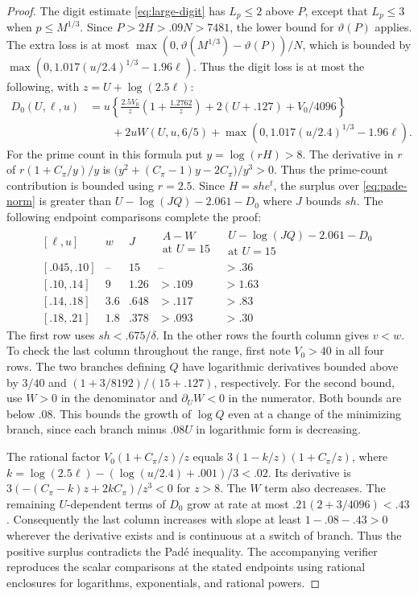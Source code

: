 \begin{proof}
The digit estimate \eqref{eq:large-digit} has \(L_p\le2\)
above \(P\), except that \(L_p\le3\) when \(p\le M^{1/3}\).
Since \(P>2H>.09N>7481\), the lower bound for
\(\vartheta(P)\) applies. The extra loss is at most
\(\max(0,\vartheta(M^{1/3})-\vartheta(P))/N\), which is
bounded by \(\max(0,1.017(u/2.4)^{1/3}-1.96\ell)\).
Thus the digit loss is at most the following, with
\(z=U+\log(2.5\ell)\):
\[
\begin{aligned}
 D_0(U,\ell,u)
  &=u\left\{\frac{2.5V_0}{z}\left(1+\frac{1.2762}{z}\right)
                       +2(U+.127)+V_0/4096\right\}\\
  &\qquad+2uW(U,u,6/5)+\max(0,1.017(u/2.4)^{1/3}-1.96\ell).
\end{aligned}
\]
For the prime count in this formula put \(y=\log(rH)>8\).
The derivative in \(r\) of \(r(1+C_\pi/y)/y\) is
\(\bigl(y^2+(C_\pi-1)y-2C_\pi\bigr)/y^3>0\).
Thus the prime-count contribution is bounded using \(r=2.5\). Since \(H=she^t\), the surplus over
\eqref{eq:pade-norm} is greater than
\(U-\log(JQ)-2.061-D_0\) where \(J\) bounds \(sh\).
The following endpoint comparisons complete the proof:
\[
\begin{array}{c|c|r|c|c}
{}[\ell,u]&w&J&
\substack{A-W\\\text{at }U=15}&
\substack{U-\log(JQ)-2.061-D_0\\ \text{at }U=15}\\ \hline
{}[.045,.10]&\text{--}&15&\text{--}&>.36\\
{}[.10,.14]&9&1.26&>.109&>1.63\\
{}[.14,.18]&3.6&.648&>.117&>.83\\
{}[.18,.21]&1.8&.378&>.093&>.30
\end{array}
\]
The first row uses \(sh<.675/\delta\). In the other rows
the fourth column gives \(v<w\). To check the last column throughout the range, first note
\(V_0>40\) in all four rows. The two branches defining \(Q\)
have logarithmic derivatives bounded above by \(3/40\) and
\((1+3/8192)/(15+.127)\), respectively. For the second
bound, use \(W>0\) in the denominator and \(\partial_U W<0\)
in the numerator. Both bounds are below \(.08\).
This bounds the growth of \(\log Q\) even at a change
of the minimizing branch, since each branch minus \(.08U\)
in logarithmic form is decreasing.

The rational factor \(V_0(1+C_\pi/z)/z\) equals
\(3(1-k/z)(1+C_\pi/z)\), where
\(k=\log(2.5\ell)-(\log(u/2.4)+.001)/3<.02\).
Its derivative is \(3(-(C_\pi-k)z+2kC_\pi)/z^3<0\)
for \(z>8\).
The \(W\) term also decreases. The remaining \(U\)-dependent
terms of \(D_0\) grow at rate at most
\(.21(2+3/4096)<.43\). Consequently the last column increases
with slope at least \(1-.08-.43>0\) wherever the derivative exists
and is continuous at a switch of branch.
Thus the positive surplus contradicts the Padé inequality.
The accompanying verifier reproduces the scalar comparisons
at the stated endpoints using rational enclosures for logarithms,
exponentials, and rational powers.
\end{proof}

